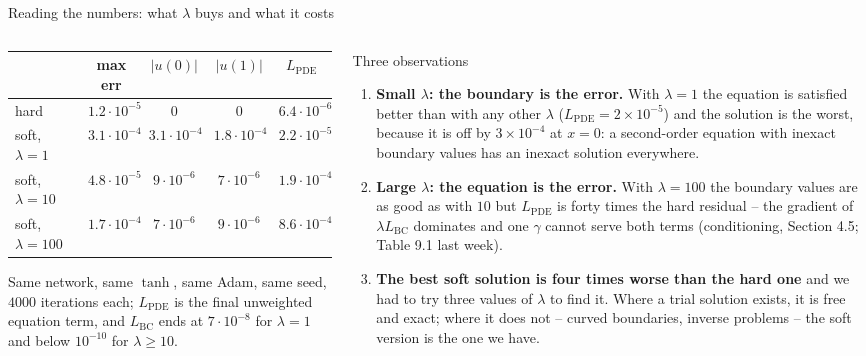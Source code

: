 \documentclass[10pt,aspectratio=169]{beamer}
\begin{document}
\begin{frame}{Reading the numbers: what $\lambda$ buys and what it costs}
\small
\begin{columns}[T]
\begin{column}{0.5\textwidth}
\begin{center}
\scriptsize
\setlength{\tabcolsep}{3pt}
\begin{tabular}{@{}lcccc@{}}
\toprule
 & max err & $|u(0)|$ & $|u(1)|$ & $L_{\mathrm{PDE}}$\\
\midrule
hard & $1.2\cdot10^{-5}$ & $0$ & $0$ & $6.4\cdot10^{-6}$\\
soft, $\lambda=1$ & $3.1\cdot10^{-4}$ & $3.1\cdot10^{-4}$ & $1.8\cdot10^{-4}$ & $2.2\cdot10^{-5}$\\
soft, $\lambda=10$ & $4.8\cdot10^{-5}$ & $9\cdot10^{-6}$ & $7\cdot10^{-6}$ & $1.9\cdot10^{-4}$\\
soft, $\lambda=100$ & $1.7\cdot10^{-4}$ & $7\cdot10^{-6}$ & $9\cdot10^{-6}$ & $8.6\cdot10^{-4}$\\
\bottomrule
\end{tabular}
\end{center}
\scriptsize
Same network, same $\tanh$, same Adam, same seed, $4000$ iterations each;
$L_{\mathrm{PDE}}$ is the final unweighted equation term, and
$L_{\mathrm{BC}}$ ends at $7\cdot10^{-8}$ for $\lambda=1$ and below
$10^{-10}$ for $\lambda\ge10$.
\end{column}
\begin{column}{0.48\textwidth}
\begin{block}{Three observations}
\scriptsize
\begin{enumerate}
  \item \textbf{Small $\lambda$: the boundary is the error.}  With
        $\lambda=1$ the equation is satisfied better than with any other
        $\lambda$ ($L_{\mathrm{PDE}}=2\times10^{-5}$) and the solution is
        the worst, because it is off by $3\times10^{-4}$ at $x=0$: a
        second-order equation with inexact boundary values has an inexact
        solution everywhere.
  \item \textbf{Large $\lambda$: the equation is the error.}  With
        $\lambda=100$ the boundary values are as good as with $10$ but
        $L_{\mathrm{PDE}}$ is forty times the hard residual -- the gradient
        of $\lambda L_{\mathrm{BC}}$ dominates and one $\gamma$ cannot serve
        both terms (conditioning, Section 4.5; Table 9.1 last week).
  \item \textbf{The best soft solution is four times worse than the hard
        one} and we had to try three values of $\lambda$ to find it.  Where
        a trial solution exists, it is free and exact; where it does not --
        curved boundaries, inverse problems -- the soft version is the one
        we have.
\end{enumerate}
\end{block}
\end{column}
\end{columns}
\end{frame}
\end{document}
